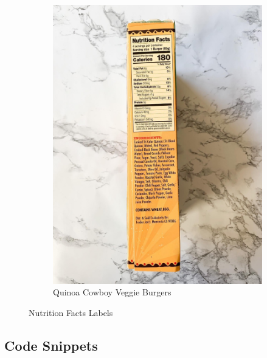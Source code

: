 \documentclass{article}
\begin{document}
\begin{figure}[h]
\begin{subfigure}{0.2\textwidth}
        \includegraphics[width=\linewidth]{burger.jpg}
        \caption{Quinoa Cowboy Veggie Burgers}
        \label{fig:5}
    \end{subfigure}
    \caption{Nutrition Facts Labels}
    \label{fig:nutrition_facts}
\end{figure}

\newpage
\subsection{Code Snippets}
\end{document}
